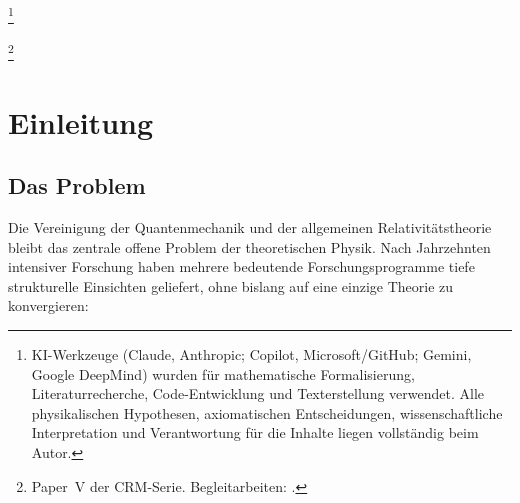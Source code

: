 \documentclass[aps,prd,twocolumn,superscriptaddress,nofootinbib]{revtex4-2}
\begin{document}

\thanks{KI-Werkzeuge (Claude, Anthropic; Copilot, Microsoft/GitHub; Gemini, Google DeepMind) wurden für mathematische Formalisierung, Literaturrecherche, Code-Entwicklung und Texterstellung verwendet. Alle physikalischen Hypothesen, axiomatischen Entscheidungen, wissenschaftliche Interpretation und Verantwortung für die Inhalte liegen vollständig beim Autor.}

\thanks{Paper~V der CRM-Serie. Begleitarbeiten: \cite{Geiger2026,Geiger2026b,Geiger2026c,Geiger2026d}.}

\maketitle

\section{Einleitung}
\label{sec:intro}

\subsection{Das Problem}

Die Vereinigung der Quantenmechanik und der allgemeinen Relativitätstheorie bleibt das zentrale offene Problem der theoretischen Physik. Nach Jahrzehnten intensiver Forschung haben mehrere bedeutende Forschungsprogramme tiefe strukturelle Einsichten geliefert, ohne bislang auf eine einzige Theorie zu konvergieren:
\end{document}
